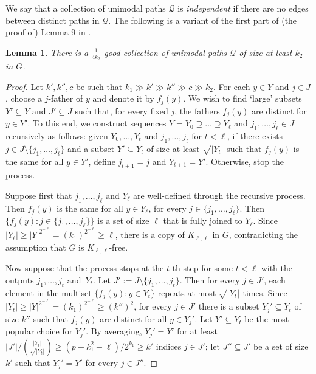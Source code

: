 \documentclass[11pt,english]{article}
\theoremstyle{plain}
\newtheorem{lem}[thm]{Lemma}
\theoremstyle{definition}
\theoremstyle{remark}
\newcommand{\Q}{\mathcal{Q}}
\begin{document}
    We say that a collection of unimodal paths $\Q$ %
    is \emph{independent} if there are no edges between distinct paths in $\Q$.    
	The following is a variant of the first part of (the proof of) Lemma 9 in \cite{bousquet-thomasse}.
	\begin{lem} \label{lem:good-x}
	    There is a $\frac{1}{4k_2}$-good collection of unimodal paths $\Q$ of size at least $k_2$ in $G$.
	\end{lem}
    \begin{proof}
			Let $k', k'', c$ be such that $k_1 \gg k' \gg k'' \gg c \gg k_2$.
            For each $y \in Y$ and $j \in J$, choose a $j$-father of $y$ and denote it by $f_j(y)$. 
            We wish to find `large' subsets $Y' \subseteq Y$ and $J' \subseteq J$ such that, for every fixed $j$, the fathers $f_j(y)$ are distinct for $y \in Y'$.
            To this end, we construct sequences $Y = Y_0 \supseteq \ldots \supseteq Y_\ell$ and $j_1, \ldots, j_\ell \in J$ recursively as follows: 
            given $Y_0, \ldots, Y_t$ and $j_1, \ldots, j_t$ for $t < \ell$, if there exists $j \in J \setminus \{j_1, \ldots, j_t\}$ and a subset $Y' \subseteq Y_t$ of size at least $\sqrt{|Y_t|}$ such that $f_j(y)$ is the same for all $y \in Y'$, define $j_{t+1} = j$ and $Y_{t+1} = Y'$. Otherwise, stop the process.
            
			Suppose first that $j_1, \ldots, j_\ell$ and $Y_\ell$ are well-defined through the recursive process. Then $f_j(y)$ is the same for all $y \in Y_{\ell}$, for every $j \in \{j_1, \ldots, j_{\ell}\}$. Then $\{f_j(y) : j \in \{j_1, \ldots, j_{\ell}\}\}$ is a set of size $\ell$ that is fully joined to $Y_{\ell}$. 
			Since $|Y_{\ell}| \ge |Y|^{2^{-\ell}}=(k_1)^{2^{-\ell}} \ge \ell$, there is a copy of $K_{\ell, \ell}$ in $G$, contradicting the assumption that $G$ is $K_{\ell, \ell}$-free.
            
			Now suppose that the process stops at the $t$-th step for some $t<\ell$ with the outputs $j_1, \ldots, j_t$ and~$Y_t$. 
			Let $J' := J \setminus \{j_1, \ldots, j_t\}$.
			Then for every $j \in J'$, each element in the multiset $\{f_j(y) : y \in Y_t\}$ repeats at most $\sqrt{|Y_t|}$ times. 
			Since $|Y_t| \ge |Y|^{2^{-\ell}}=(k_1)^{2^{-\ell}} \ge (k'')^2$, for every $j \in J'$ there is a subset $Y_j' \subseteq Y_t$ of size $k''$ such that $f_j(y)$ are distinct for all $y \in Y_j'$. 
			Let $Y' \subseteq Y_t$ be the most popular choice for $Y_j'$. By averaging, $Y_j' = Y'$ for at least $|J'| / \binom{|Y_t|}{\sqrt{|Y_t|}} \ge (p - k_1^2 - \ell)/2^{k_1} \ge k'$ indices $j \in J'$; let $J'' \subseteq J'$ be a set of size $k'$ such that $Y_j' = Y'$ for every $j \in J''$.


\end{proof}
\end{document}
